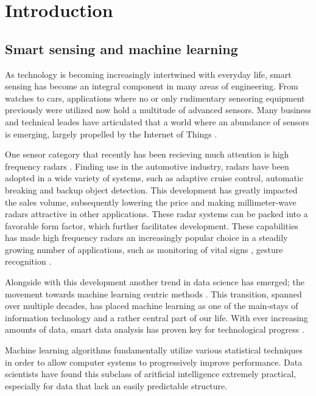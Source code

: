 \chapter{Introduction}

\section{Smart sensing and machine learning}

As technology is becoming increasingly intertwined with everyday life, smart sensing has become an integral component in many areas of engineering. From watches to cars, applications where no or only rudimentary sensoring equipment previously were utilized now hold a multitude of advanced sensors. Many business and technical leades have articulated that a world where an abundance of sensors is emerging, largely propelled by the Internet of Things \citep{bryzek_2013}. 

One sensor category that recently has been recieving much attention is high frequency radars \citep{frenzel_2018}. Finding use in the automotive industry, radars have been adopted in a wide variety of systems, such as adaptive cruise control, automatic breaking and backup object detection. This development has greatly impacted the sales volume, subsequently lowering the price and making millimeter-wave radars attractive in other applications. These radar systems can be packed into a favorable form factor, which further facilitates development. These capabilities has made high frequency radars an increasingly popular choice in a steadily growing number of applications, such as monitoring of vital signs \citep{kuo_lin_yu_lo_lyu_chou_chuang_2016}, gesture recognition \citep{lien_gillian_karagozler_amihood_schwesig_olson_raja_poupyrev_2016}.

Alongside with this development another trend in data science has emerged; the movement towards machine learning centric methods . This transition, spanned over multiple decades, has placed machine learning as one of the main-stays of information technology and a rather central part of our life. With ever increasing amounts of data, smart data analysis has proven key for technological progress \citep{a_smola_svn_vishwanathan_2010}.

Machine learning algorithms fundamentally utilize various statistical techniques in order to allow computer systems to progressively improve performance. Data scientists have found this subclass of aritficial intelligence extremely practical, especially for data that lack an easily predictable structure. 


